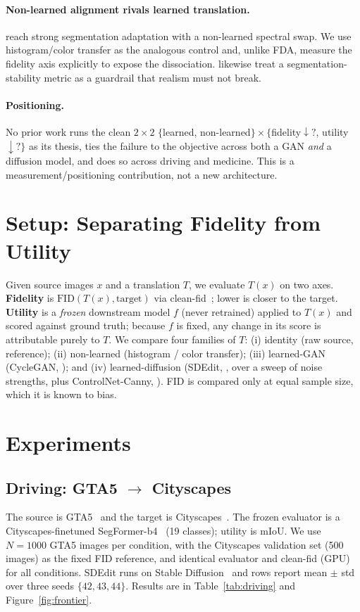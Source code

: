 \documentclass{article}
\begin{document}
\paragraph{Non-learned alignment rivals learned translation.}
\citet{yang2020fda} reach strong segmentation adaptation with a non-learned
spectral swap. We use histogram/color transfer as the analogous control and,
unlike FDA, measure the fidelity axis explicitly to expose the dissociation.
\citet{richter2022enhancing} likewise treat a segmentation-stability metric as a
guardrail that realism must not break.

\paragraph{Positioning.} No prior work runs the clean $2\times2$
$\{$learned, non-learned$\}\times\{$fidelity$\downarrow?$, utility$\downarrow?\}$
as its thesis, ties the failure to the objective across both a GAN \emph{and} a
diffusion model, and does so across driving and medicine. This is a
measurement/positioning contribution, not a new architecture.

\section{Setup: Separating Fidelity from Utility}
\label{sec:setup}
Given source images $x$ and a translation $T$, we evaluate $T(x)$ on two axes.
\textbf{Fidelity} is $\mathrm{FID}(T(x),\text{target})$ via
clean-fid~\citep{parmar2022cleanfid}; lower is closer to the target.
\textbf{Utility} is a \emph{frozen} downstream model $f$ (never retrained) applied
to $T(x)$ and scored against ground truth; because $f$ is fixed, any change in its
score is attributable purely to $T$. We compare four families of $T$:
(i) identity (raw source, reference); (ii) non-learned (histogram / color
transfer); (iii) learned-GAN (CycleGAN, \citealp{zhu2017cyclegan}); and
(iv) learned-diffusion (SDEdit, \citealp{meng2022sdedit}, over a sweep of noise
strengths, plus ControlNet-Canny, \citealp{zhang2023controlnet}). FID is compared
only at equal sample size, which it is known to bias.

\section{Experiments}

\subsection{Driving: GTA5 $\rightarrow$ Cityscapes}
The source is GTA5~\citep{richter2016playing} and the target is
Cityscapes~\citep{cordts2016cityscapes}. The frozen evaluator is a
Cityscapes-finetuned SegFormer-b4~\citep{xie2021segformer} (19 classes); utility is
mIoU. We use $N{=}1000$ GTA5 images per condition, with the Cityscapes validation
set (500 images) as the fixed FID reference, and identical evaluator and clean-fid
(GPU) for all conditions. SDEdit runs on Stable Diffusion~\citep{rombach2022ldm}
and rows report mean $\pm$ std over three seeds $\{42,43,44\}$. Results are in
Table~\ref{tab:driving} and Figure~\ref{fig:frontier}.
\end{document}
